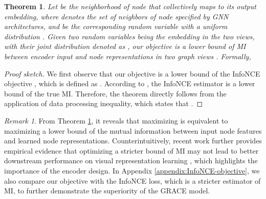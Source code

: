 \documentclass{article}
\newtheorem{theorem}{Theorem}[section]
\theoremstyle{remark}
\newtheorem*{remark}{Remark}
\begin{document}
\begin{theorem}
\label{thm:objective-InfoMax}
Let  be the neighborhood of node  that collectively maps to its output embedding, where  denotes the set of neighbors of node  specified by GNN architectures, and  be the corresponding random variable with a uniform distribution . Given two random variables  being the embedding in the two views, with their joint distribution denoted as , our objective  is a lower bound of MI between encoder input  and node representations in two graph views . Formally,

\end{theorem}
\begin{proof}[Proof sketch]
We first observe that our objective  is a lower bound of the InfoNCE objective \cite{vandenOord:2018ut}, which is defined as  \cite{Poole:2019vk}. According to \cite{vandenOord:2018ut}, the InfoNCE estimator is a lower bound of the true MI. Therefore, the theorem directly follows from the application of data processing inequality, which states that .
\end{proof}
\begin{remark}
From Theorem \ref{thm:objective-InfoMax}, it reveals that maximizing  is equivalent to maximizing a lower bound of the mutual information  between input node features and learned node representations.
Counterintuitively, recent work further provides empirical evidence that optimizing a stricter bound of MI may not lead to better downstream performance on visual representation learning \cite{Tschannen:2020uo}, which highlights the importance of the encoder design. In Appendix \ref{appendix:InfoNCE-objective}, we also compare our objective with the InfoNCE loss, which is a stricter estimator of MI, to further demonstrate the superiority of the GRACE model.
\end{remark}
\end{document}
